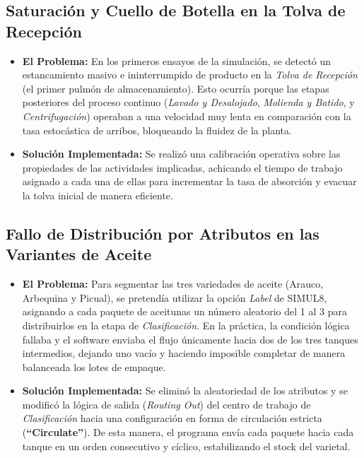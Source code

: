 \documentclass[runningheads]{llncs}
\begin{document}
\subsection{Saturación y Cuello de Botella en la Tolva de Recepción}
\begin{itemize}
    \item \textbf{El Problema:} En los primeros ensayos de la simulación, se detectó un estancamiento masivo e ininterrumpido de producto en la \textit{Tolva de Recepción} (el primer pulmón de almacenamiento). Esto ocurría porque las etapas posteriores del proceso continuo (\textit{Lavado y Desalojado}, \textit{Molienda y Batido}, y \textit{Centrifugación}) operaban a una velocidad muy lenta en comparación con la tasa estocástica de arribos, bloqueando la fluidez de la planta.
    \item \textbf{Solución Implementada:} Se realizó una calibración operativa sobre las propiedades de las actividades implicadas, achicando el tiempo de trabajo asignado a cada una de ellas para incrementar la tasa de absorción y evacuar la tolva inicial de manera eficiente.
\end{itemize}

\subsection{Fallo de Distribución por Atributos en las Variantes de Aceite}
\begin{itemize}
    \item \textbf{El Problema:} Para segmentar las tres variedades de aceite (Arauco, Arbequina y Picual), se pretendía utilizar la opción \textit{Label} de SIMUL8, asignando a cada paquete de aceitunas un número aleatorio del 1 al 3 para distribuirlos en la etapa de \textit{Clasificación}. En la práctica, la condición lógica fallaba y el software enviaba el flujo únicamente hacia dos de los tres tanques intermedios, dejando uno vacío y haciendo imposible completar de manera balanceada los lotes de empaque.
    \item \textbf{Solución Implementada:} Se eliminó la aleatoriedad de los atributos y se modificó la lógica de salida (\textit{Routing Out}) del centro de trabajo de \textit{Clasificación} hacia una configuración en forma de circulación estricta (\textbf{``Circulate''}). De esta manera, el programa envía cada paquete hacia cada tanque en un orden consecutivo y cíclico, estabilizando el stock del varietal.
\end{itemize}
\end{document}
